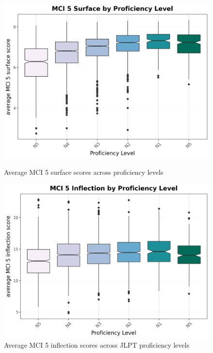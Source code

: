 \begin{figure}[htbp]
    \centering
    \begin{minipage}{.48\textwidth}
        \centering
    \includegraphics[scale=.4]{img/MCI5surface}
    \caption[Average MCI 5 surface scores across Proficiency levels]{Average MCI 5 surface scores across proficiency levels}
        \label{fig:MCI5surface}
    \end{minipage}
    \hfill
\begin{minipage}{.48\textwidth}
        \centering
        \includegraphics[scale=.4]{img/MCI5inflection}
        \caption[Average MCI 5 inflection scores across Proficiency levels]{Average MCI 5 inflection scores across JLPT proficiency levels}
\label{fig:MCI5inflection}
\end{minipage}
    \end{figure}

